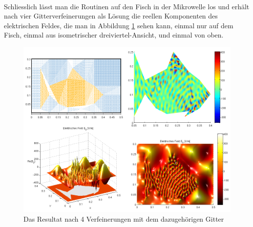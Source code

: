 \documentclass[ngerman,11pt,a4paper,titlepage]{article}
\begin{document}
\paragraph{}Schliesslich lässt man die Routinen auf den Fisch in der Mikrowelle los und erhält nach vier Gitterverfeinerungen als Lösung die reellen Komponenten des elektrischen Feldes, die man in Abbildung \ref{res} sehen kann, einmal nur auf dem Fisch, einmal aus isometrischer dreiviertel-Ansicht, und einmal von oben.
\begin{figure}[h]
  \begin{center}
    \includegraphics[scale=0.5]{pics/end_result_all.png}
  \end{center}
  \caption{Das Resultat nach 4 Verfeinerungen mit dem dazugehörigen Gitter}
  \label{res}
\end{figure}
\end{document}
